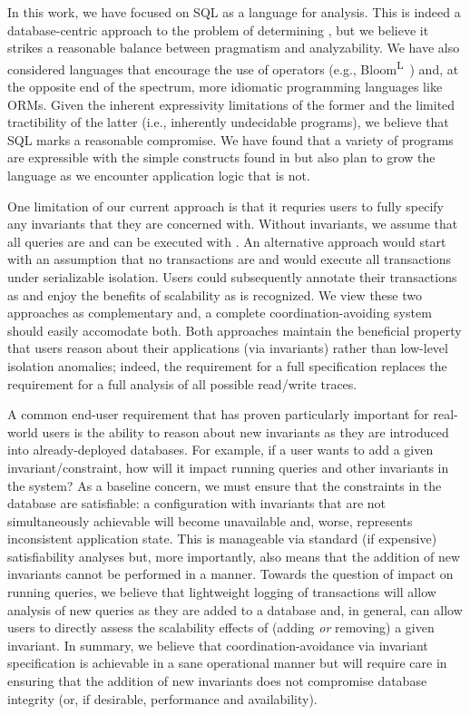  In this work, we have
focused on SQL as a language for analysis. This is indeed a
database-centric approach to the problem of determining \iconfluence,
but we believe it strikes a reasonable balance between pragmatism and
analyzability. We have also considered languages that encourage the
use of \iconfluent operators (e.g.,
Bloom\textsuperscript{L}~\cite{blooml}) and, at the opposite end of
the spectrum, more idiomatic programming languages like ORMs. Given
the inherent expressivity limitations of the former and the limited
tractibility of the latter (i.e., inherently undecidable programs), we
believe that SQL marks a reasonable compromise. We have found that a
variety of programs are expressible with the simple constructs found
in \lang but also plan to grow the language as we encounter
application logic that is not.

 One limitation of our current
approach is that it requries users to fully specify any invariants
that they are concerned with. Without invariants, we assume that all
queries are \iconfluent and can be executed with \cfreedom. An
alternative approach would start with an assumption that no
transactions are \iconfluent and would execute all transactions under
serializable isolation. Users could subsequently annotate their
transactions as \iconfluent and enjoy the benefits of scalability as
\cfreedom is recognized. We view these two approaches as complementary
and, a complete coordination-avoiding system should easily accomodate
both. Both approaches maintain the beneficial property that users
reason about their applications (via invariants) rather than low-level
isolation anomalies; indeed, the requirement for a full specification
replaces the requirement for a full analysis of all possible
read/write traces.

 A common end-user requirement that has
proven particularly important for real-world users is the ability to
reason about new invariants as they are introduced into
already-deployed databases. For example, if a user wants to add a
given invariant/constraint, how will it impact running queries and
other invariants in the system? As a baseline concern, we must ensure
that the constraints in the database are satisfiable: a configuration
with invariants that are not simultaneously achievable will become
unavailable and, worse, represents inconsistent application
state. This is manageable via standard (if expensive) satisfiability
analyses but, more importantly, also means that the addition of new
invariants cannot be performed in a \cfree manner. Towards the
question of impact on running queries, we believe that lightweight
logging of transactions will allow analysis of new queries as they are
added to a database and, in general, can allow users to directly
assess the scalability effects of (adding \textit{or} removing) a
given invariant. In summary, we believe that coordination-avoidance
via invariant specification is achievable in a sane operational manner
but will require care in ensuring that the addition of new invariants
does not compromise database integrity (or, if desirable, performance
and availability).
